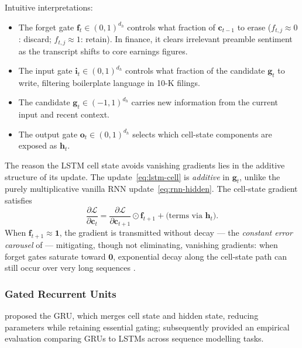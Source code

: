 \begin{deepdive}
Intuitive interpretations:
\begin{itemize}
  \item The forget gate $\mathbf{f}_t \in (0,1)^{d_h}$ controls what
        fraction of $\mathbf{c}_{t-1}$ to erase ($f_{t,j}\approx 0$:
        discard; $f_{t,j}\approx 1$: retain).  In finance, it clears
        irrelevant preamble sentiment as the transcript shifts to core
        earnings figures.
  \item The input gate $\mathbf{i}_t \in (0,1)^{d_h}$ controls what
        fraction of the candidate $\mathbf{g}_t$ to write, filtering
        boilerplate language in 10-K filings.
  \item The candidate $\mathbf{g}_t \in (-1,1)^{d_h}$ carries new
        information from the current input and recent context.
  \item The output gate $\mathbf{o}_t \in (0,1)^{d_h}$ selects which
        cell-state components are exposed as $\mathbf{h}_t$.
\end{itemize}

The reason the LSTM cell state avoids vanishing gradients lies in the additive structure of its update. The update~\eqref{eq:lstm-cell} is \emph{additive} in $\mathbf{g}_t$, unlike the
purely multiplicative vanilla RNN update~\eqref{eq:rnn-hidden}.
The cell-state gradient satisfies
\begin{equation}
  \frac{\partial \mathcal{L}}{\partial \mathbf{c}_t}
  = \frac{\partial \mathcal{L}}{\partial \mathbf{c}_{t+1}} \odot \mathbf{f}_{t+1}
    + \text{(terms via } \mathbf{h}_t\text{)}.
  \label{eq:lstm-cellgrad}
\end{equation}
When $\mathbf{f}_{t+1} \approx \mathbf{1}$, the gradient is transmitted without
decay --- the \emph{constant error carousel} of \citeauthor{hochreiter1997long} %
--- mitigating, though not eliminating, vanishing gradients: when forget gates
saturate toward $\mathbf{0}$, exponential decay along the cell-state path
can still occur over very long sequences \citep{bengio1994learning}.

\subsubsection{Gated Recurrent Units}

\citet{cho2014learning} %
proposed the GRU, which merges cell state and hidden state, reducing parameters
while retaining essential gating; \citet{chung2014empirical} subsequently provided
an empirical evaluation comparing GRUs to LSTMs across sequence modelling tasks.


\end{deepdive}
